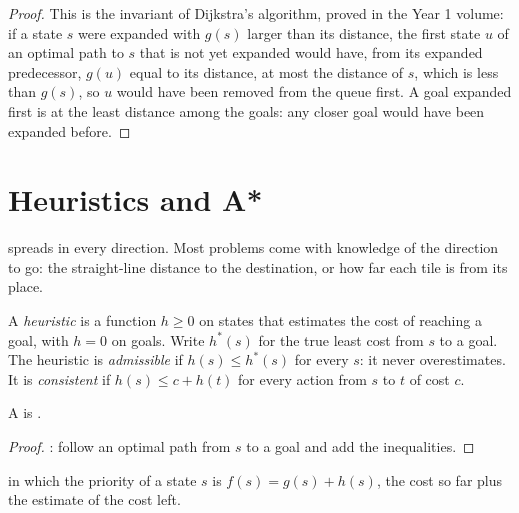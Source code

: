 \begin{proof}
This is the invariant of Dijkstra's algorithm, proved in the Year 1 volume: if a state $s$ were expanded with $g(s)$
larger than its distance, the first state $u$ of an optimal path to $s$ that is not yet expanded would have, from its
expanded predecessor, $g(u)$ equal to its distance, at most the distance of $s$, which is less than $g(s)$, so $u$ would
have been removed from the queue first. A goal expanded first is at the least distance among the goals: any closer goal
would have been expanded before.
\end{proof}

\section{Heuristics and A*}\label{sec:b2:search-and-games:astar}

 spreads in every direction. Most problems come with knowledge of the direction to go: the
straight-line distance to the destination, or how far each tile is from its place.

\begin{definition}\label{def:b2:search-and-games:heuristic}
A \emph{heuristic} is a function $h \geq 0$ on states that estimates the cost of reaching a goal, with
$h = 0$ on goals. Write $h^*(s)$ for the true least cost from $s$ to a goal. The heuristic is
\emph{admissible} if $h(s) \leq h^*(s)$ for every $s$: it never overestimates. It is
\emph{consistent} if $h(s) \leq c + h(t)$ for every action from $s$ to $t$ of cost $c$.
\end{definition}

\begin{proposition}\label{prop:b2:search-and-games:consistent-admissible}
A  is .
\end{proposition}

\begin{proof}
: follow an optimal path from $s$ to a goal and add the inequalities.
\end{proof}

\begin{method}[A*]\label{met:b2:search-and-games:astar}
 in which the priority of a state $s$ is $f(s) = g(s) + h(s)$, the cost so far plus the estimate of the
cost left.
\end{method}

